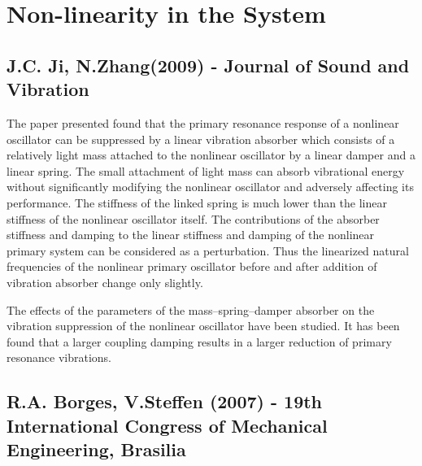 \section{Non-linearity in the System}
\subsection{J.C. Ji, N.Zhang(2009) - Journal of Sound and Vibration}
The paper presented found that the primary resonance response of a nonlinear oscillator can be suppressed by a linear vibration absorber which consists of a relatively light mass attached to the nonlinear oscillator by a linear damper and a linear spring. The small attachment of light mass can absorb vibrational energy without significantly modifying the nonlinear oscillator and adversely affecting its performance. The stiffness of the linked spring is much lower than the linear stiffness of the nonlinear oscillator itself.
The contributions of the absorber stiffness and damping to the linear stiffness and damping of the nonlinear primary system can be considered as a perturbation. Thus the linearized natural frequencies of the nonlinear primary oscillator before and after addition of vibration absorber change only slightly.

The effects of the parameters of the mass–spring–damper absorber on the vibration suppression of the nonlinear oscillator have been studied. It has been found that a larger coupling damping results in a larger reduction of primary resonance vibrations.

\subsection{R.A. Borges, V.Steffen (2007) - 19th International Congress of Mechanical Engineering, Brasilia}
%